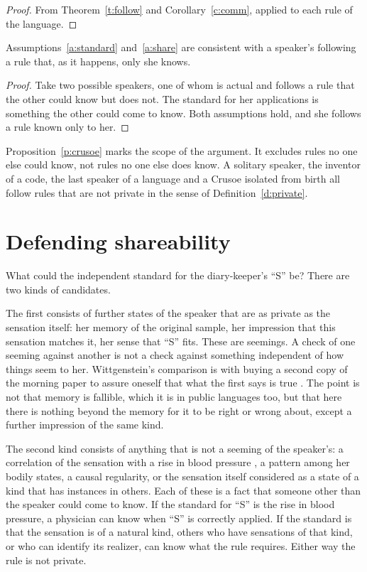 \documentclass{situationist-preprint}
\begin{document}
\begin{proof}
From Theorem~\ref{t:follow} and Corollary~\ref{c:comm}, applied to each rule of the language.
\end{proof}

\begin{proposition}[Crusoe]\label{p:crusoe}
Assumptions~\ref{a:standard} and~\ref{a:share} are consistent with a speaker's following a rule that, as it happens, only she knows.
\end{proposition}

\begin{proof}
Take two possible speakers, one of whom is actual and follows a rule that the other could know but does not. The standard for her applications is something the other could come to know. Both assumptions hold, and she follows a rule known only to her.
\end{proof}

Proposition~\ref{p:crusoe} marks the scope of the argument. It excludes rules no one else could know, not rules no one else does know. A solitary speaker, the inventor of a code, the last speaker of a language and a Crusoe isolated from birth all follow rules that are not private in the sense of Definition~\ref{d:private}.

\section{Defending shareability}\label{s:share}

What could the independent standard for the diary-keeper's \enquote{S} be? There are two kinds of candidates.

The first consists of further states of the speaker that are as private as the sensation itself: her memory of the original sample, her impression that this sensation matches it, her sense that \enquote{S} fits. These are seemings. A check of one seeming against another is not a check against something independent of how things seem to her. Wittgenstein's comparison is with buying a second copy of the morning paper to assure oneself that what the first says is true \citep[\S265]{Wittgenstein1953}. The point is not that memory is fallible, which it is in public languages too, but that here there is nothing beyond the memory for it to be right or wrong about, except a further impression of the same kind.

The second kind consists of anything that is not a seeming of the speaker's: a correlation of the sensation with a rise in blood pressure \citep[\S270]{Wittgenstein1953}, a pattern among her bodily states, a causal regularity, or the sensation itself considered as a state of a kind that has instances in others. Each of these is a fact that someone other than the speaker could come to know. If the standard for \enquote{S} is the rise in blood pressure, a physician can know when \enquote{S} is correctly applied. If the standard is that the sensation is of a natural kind, others who have sensations of that kind, or who can identify its realizer, can know what the rule requires. Either way the rule is not private.
\end{document}
